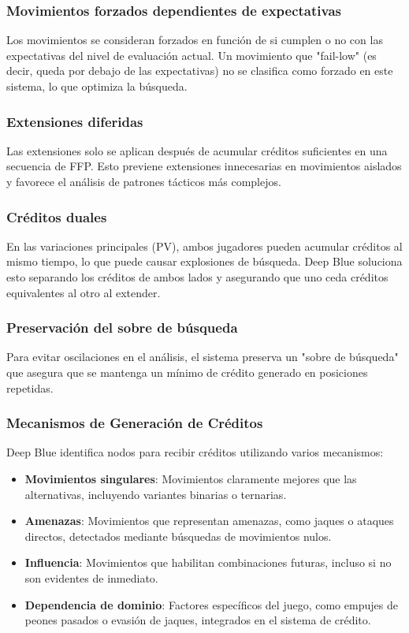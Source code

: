 \documentclass[12pt,a4paper]{article}
\begin{document}
\subsubsection*{Movimientos forzados dependientes de expectativas}
Los movimientos se consideran forzados en función de si cumplen o no con las expectativas del nivel de evaluación actual. Un movimiento que "fail-low" (es decir, queda por debajo de las expectativas) no se clasifica como forzado en este sistema, lo que optimiza la búsqueda.

\subsubsection*{Extensiones diferidas}
Las extensiones solo se aplican después de acumular créditos suficientes en una secuencia de FFP. Esto previene extensiones innecesarias en movimientos aislados y favorece el análisis de patrones tácticos más complejos.

\subsubsection*{Créditos duales}
En las variaciones principales (PV), ambos jugadores pueden acumular créditos al mismo tiempo, lo que puede causar explosiones de búsqueda. Deep Blue soluciona esto separando los créditos de ambos lados y asegurando que uno ceda créditos equivalentes al otro al extender.

\subsubsection*{Preservación del sobre de búsqueda}
Para evitar oscilaciones en el análisis, el sistema preserva un "sobre de búsqueda" que asegura que se mantenga un mínimo de crédito generado en posiciones repetidas.

\subsubsection*{Mecanismos de Generación de Créditos}
Deep Blue identifica nodos para recibir créditos utilizando varios mecanismos:
\begin{itemize}
    \item \textbf{Movimientos singulares}: Movimientos claramente mejores que las alternativas, incluyendo variantes binarias o ternarias.
    \item \textbf{Amenazas}: Movimientos que representan amenazas, como jaques o ataques directos, detectados mediante búsquedas de movimientos nulos.
    \item \textbf{Influencia}: Movimientos que habilitan combinaciones futuras, incluso si no son evidentes de inmediato.
    \item \textbf{Dependencia de dominio}: Factores específicos del juego, como empujes de peones pasados o evasión de jaques, integrados en el sistema de crédito.
\end{itemize}
\end{document}
